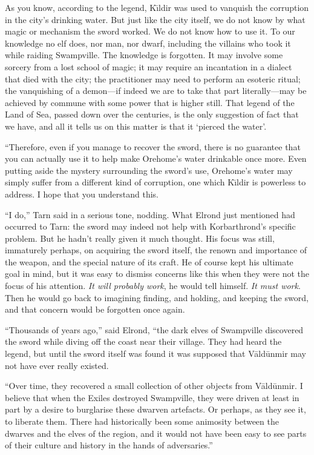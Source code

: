 As you know, according to the legend, K\=\i{}ldir was used to vanquish the corruption in the city's drinking water.  But just like the city itself, we do not know by what magic or mechanism the sword worked.  We do not know how to use it.  To our knowledge no elf does, nor man, nor dwarf, including the villains who took it while raiding Swampville.  The knowledge is forgotten.  It may involve some sorcery from a lost school of magic; it may require an incantation in a dialect that died with the city; the practitioner may need to perform an esoteric ritual; the vanquishing of a demon---if indeed we are to take that part literally---may be achieved by commune with some power that is higher still.  That legend of the Land of Sea, passed down over the centuries, is the only suggestion of fact that we have, and all it tells us on this matter is that it `pierced the water'.

``Therefore, even if you manage to recover the sword, there is no guarantee that you can actually use it to help make Orehome's water drinkable once more.  Even putting aside the mystery surrounding the sword's use, Orehome's water may simply suffer from a different kind of corruption, one which K\=\i{}ldir is powerless to address.  I hope that you understand this.

``I do,'' Tarn said in a serious tone, nodding.  What Elrond just mentioned had occurred to Tarn: the sword may indeed not help with Korbarthrond's specific problem.  But he hadn't really given it much thought.  His focus was still, immaturely perhaps, on acquiring the sword itself, the renown and importance of the weapon, and the special nature of its craft.  He of course kept his ultimate goal in mind, but it was easy to dismiss concerns like this when they were not the focus of his attention.  \emph{It will probably work}, he would tell himself.  \emph{It must work}.  Then he would go back to imagining finding, and holding, and keeping the sword, and that concern would be forgotten once again.

``Thousands of years ago,'' said Elrond, ``the dark elves of Swampville discovered the sword while diving off the coast near their village.  They had heard the legend, but until the sword itself was found it was supposed that V\=ald\=unmir may not have ever really existed.

``Over time, they recovered a small collection of other objects from V\=ald\=unmir.  I believe that when the Exiles destroyed Swampville, they were driven at least in part by a desire to burglarise these dwarven artefacts.  Or perhaps, as they see it, to liberate them.  There had historically been some animosity between the dwarves and the elves of the region, and it would not have been easy to see parts of their culture and history in the hands of adversaries.''

